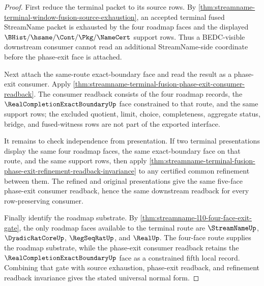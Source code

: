 \begin{proof}
First reduce the terminal packet to its source rows. By
\autoref{thm:streamname-terminal-window-fusion-source-exhaustion}, an accepted
terminal fused StreamName packet is exhausted by the four roadmap faces and the
displayed $\BHist/\hsame/\Cont/\Pkg/\NameCert$ support rows. Thus a
BEDC-visible downstream consumer cannot read an additional StreamName-side
coordinate before the phase-exit face is attached.

Next attach the same-route exact-boundary face and read the result as a
phase-exit consumer. Apply
\autoref{thm:streamname-terminal-fusion-phase-exit-consumer-readback}. The
consumer readback consists of the four roadmap records, the
$\RealCompletionExactBoundaryUp$ face constrained to that route, and the same
support rows; the excluded quotient, limit, choice, completeness, aggregate
status, bridge, and fused-witness rows are not part of the exported interface.

It remains to check independence from presentation. If two terminal
presentations display the same four roadmap faces, the same exact-boundary face
on that route, and the same support rows, then apply
\autoref{thm:streamname-terminal-fusion-phase-exit-refinement-readback-invariance}
to any certified common refinement between them. The refined and original
presentations give the same five-face phase-exit consumer readback, hence the
same downstream readback for every row-preserving consumer.

Finally identify the roadmap substrate. By
\autoref{thm:streamname-l10-four-face-exit-gate}, the only roadmap faces
available to the terminal route are $\StreamNameUp$, $\DyadicRatCoreUp$,
$\RegSeqRatUp$, and $\RealUp$. The four-face route supplies the roadmap
substrate, while the phase-exit consumer readback retains the
$\RealCompletionExactBoundaryUp$ face as a constrained fifth local record.
Combining that gate with source exhaustion, phase-exit readback, and refinement
readback invariance gives the stated universal normal form.
\end{proof}

